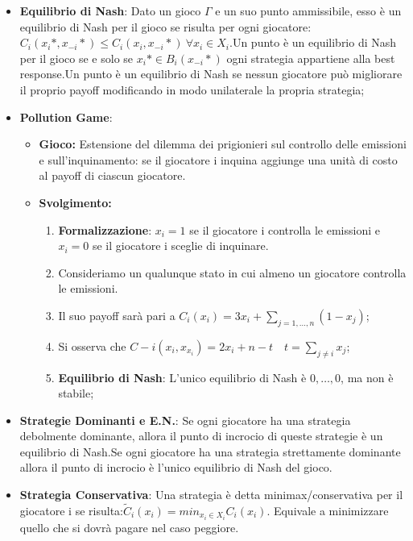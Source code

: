 \documentclass{article}
\theoremstyle{definition}
\theoremstyle{remark}
\begin{document}
\begin{itemize}
    \item \textbf{Equilibrio di Nash}: Dato un gioco $\Gamma$ e un suo punto ammissibile, esso è un equilibrio di Nash per il gioco se risulta per ogni giocatore:$C_i(x_i*,x_{-i}*)\leq C_i(x_i,x_{-i}*)\ \forall x_i\in X_i$.\newline Un punto è un equilibrio di Nash per il gioco se e solo se $x_i*\in B_i(x_{-i}*)$ ogni strategia appartiene alla best response.\newline Un punto è un equilibrio di Nash se nessun giocatore può migliorare il proprio payoff modificando in modo unilaterale la propria strategia;
    \item \textbf{Pollution Game}:\begin{itemize}
        \item \textbf{Gioco:} Estensione del dilemma dei prigionieri sul controllo delle emissioni e sull'inquinamento: se il giocatore i inquina aggiunge una unità di costo al payoff di ciascun giocatore.
        \item \textbf{Svolgimento:}\begin{enumerate}
        \item \textbf{Formalizzazione}: \(x_i=1\) se il giocatore i controlla le emissioni e \(x_i=0\) se il giocatore i sceglie di inquinare.
            \item Consideriamo un qualunque stato in cui almeno un giocatore controlla le emissioni.
            \item Il suo payoff sarà pari a \(C_i(x_i)=3x_i+\sum_{j=1,\dots,n}(1-x_j)\);
            \item Si osserva che \(C-i(x_i,x_{x_i})=2x_i+n-t\quad t=\sum_{j\neq i}x_j\);
            \item \textbf{Equilibrio di Nash}: L'unico equilibrio di Nash è \(0,\dots,0\), ma non è stabile;
        \end{enumerate}
    \end{itemize}
    \item \textbf{Strategie Dominanti e E.N.}: Se ogni giocatore ha una strategia debolmente dominante, allora il punto di incrocio di queste strategie è un equilibrio di Nash.\newline Se ogni giocatore ha una strategia strettamente dominante allora il punto di incrocio è l'unico equilibrio di Nash del gioco.
    \item \textbf{Strategia Conservativa}: Una strategia è detta minimax/conservativa per il giocatore i se risulta:$\tilde{C}_i(x_i)=min_{x_{i}\in X_{i}}C_i(x_i)$. Equivale a minimizzare quello che si dovrà pagare nel caso peggiore.

\end{itemize}
\end{document}
